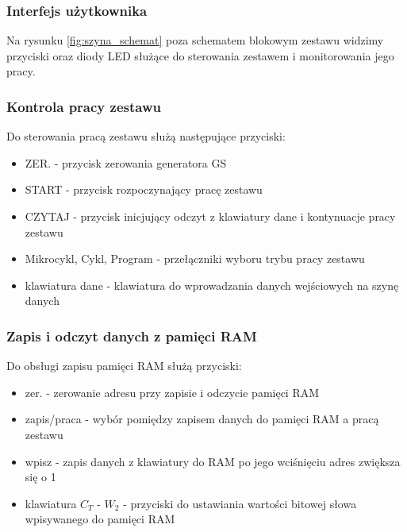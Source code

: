 \documentclass[../main.tex]{subfiles}
\begin{document}
    \subsubsection{Interfejs użytkownika}

    Na rysunku \ref{fig:szyna_schemat} poza schematem blokowym zestawu widzimy przyciski oraz diody LED służące do sterowania zestawem i 
    monitorowania jego pracy. 

    \subsubsection*{Kontrola pracy zestawu}
    Do sterowania pracą zestawu służą następujące przyciski:
    \begin{itemize}
        \item ZER. - przycisk zerowania generatora GS
        \item START - przycisk rozpoczynający pracę zestawu
        \item CZYTAJ - przycisk inicjujący odczyt z klawiatury dane i kontynuacje pracy zestawu
        \item Mikrocykl, Cykl, Program - przełączniki wyboru trybu pracy zestawu
        \item klawiatura dane - klawiatura do wprowadzania danych wejściowych na szynę danych
    \end{itemize}
    
    \subsubsection*{Zapis i odczyt danych z pamięci RAM}
    Do obsługi zapisu pamięci RAM służą przyciski:
    \begin{itemize}
        \item zer. - zerowanie adresu przy zapisie i odczycie pamięci RAM
        \item zapis/praca - wybór pomiędzy zapisem danych do pamięci RAM a pracą zestawu
        \item wpisz - zapis danych z klawiatury do RAM po jego wciśnięciu adres zwiększa się o 1
        \item klawiatura $C_T$ - $W_2$ - przyciski do ustawiania wartości bitowej słowa wpisywanego do pamięci RAM
    \end{itemize}
\end{document}
